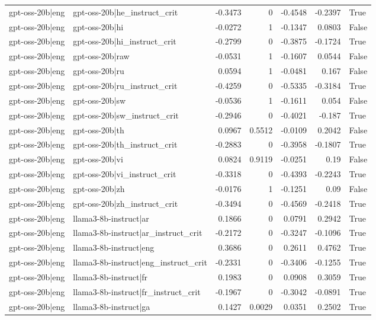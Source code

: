 \begin{table}
\begin{tabular}{l l r r r r l}
gpt-oss-20b|eng & gpt-oss-20b|he_instruct_crit & -0.3473 & 0 & -0.4548 & -0.2397 & True \\
gpt-oss-20b|eng & gpt-oss-20b|hi & -0.0272 & 1 & -0.1347 & 0.0803 & False \\
gpt-oss-20b|eng & gpt-oss-20b|hi_instruct_crit & -0.2799 & 0 & -0.3875 & -0.1724 & True \\
gpt-oss-20b|eng & gpt-oss-20b|raw & -0.0531 & 1 & -0.1607 & 0.0544 & False \\
gpt-oss-20b|eng & gpt-oss-20b|ru & 0.0594 & 1 & -0.0481 & 0.167 & False \\
gpt-oss-20b|eng & gpt-oss-20b|ru_instruct_crit & -0.4259 & 0 & -0.5335 & -0.3184 & True \\
gpt-oss-20b|eng & gpt-oss-20b|sw & -0.0536 & 1 & -0.1611 & 0.054 & False \\
gpt-oss-20b|eng & gpt-oss-20b|sw_instruct_crit & -0.2946 & 0 & -0.4021 & -0.187 & True \\
gpt-oss-20b|eng & gpt-oss-20b|th & 0.0967 & 0.5512 & -0.0109 & 0.2042 & False \\
gpt-oss-20b|eng & gpt-oss-20b|th_instruct_crit & -0.2883 & 0 & -0.3958 & -0.1807 & True \\
gpt-oss-20b|eng & gpt-oss-20b|vi & 0.0824 & 0.9119 & -0.0251 & 0.19 & False \\
gpt-oss-20b|eng & gpt-oss-20b|vi_instruct_crit & -0.3318 & 0 & -0.4393 & -0.2243 & True \\
gpt-oss-20b|eng & gpt-oss-20b|zh & -0.0176 & 1 & -0.1251 & 0.09 & False \\
gpt-oss-20b|eng & gpt-oss-20b|zh_instruct_crit & -0.3494 & 0 & -0.4569 & -0.2418 & True \\
gpt-oss-20b|eng & llama3-8b-instruct|ar & 0.1866 & 0 & 0.0791 & 0.2942 & True \\
gpt-oss-20b|eng & llama3-8b-instruct|ar_instruct_crit & -0.2172 & 0 & -0.3247 & -0.1096 & True \\
gpt-oss-20b|eng & llama3-8b-instruct|eng & 0.3686 & 0 & 0.2611 & 0.4762 & True \\
gpt-oss-20b|eng & llama3-8b-instruct|eng_instruct_crit & -0.2331 & 0 & -0.3406 & -0.1255 & True \\
gpt-oss-20b|eng & llama3-8b-instruct|fr & 0.1983 & 0 & 0.0908 & 0.3059 & True \\
gpt-oss-20b|eng & llama3-8b-instruct|fr_instruct_crit & -0.1967 & 0 & -0.3042 & -0.0891 & True \\
gpt-oss-20b|eng & llama3-8b-instruct|ga & 0.1427 & 0.0029 & 0.0351 & 0.2502 & True \\

\end{tabular}
\end{table}
